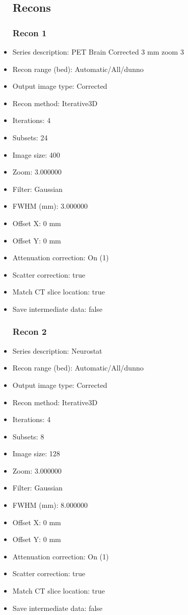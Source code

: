 \documentclass[12pt]{article}
\begin{document}
\begin{itemize}
\subsection{Recons}
\subsubsection{Recon 1}
\item Series description: PET Brain Corrected 3 mm zoom 3
\item Recon range (bed): Automatic/All/dunno
\item Output image type: Corrected
\item Recon method: Iterative3D
\item Iterations: 4
\item Subsets: 24
\item Image size: 400
\item Zoom: 3.000000
\item Filter: Gaussian
\item FWHM (mm): 3.000000
\item Offset X: 0 mm
\item Offset Y: 0 mm
\item Attenuation correction: On (1)
\item Scatter correction: true
\item Match CT slice location: true
\item Save intermediate data: false
\subsubsection{Recon 2}
\item Series description: Neurostat
\item Recon range (bed): Automatic/All/dunno
\item Output image type: Corrected
\item Recon method: Iterative3D
\item Iterations: 4
\item Subsets: 8
\item Image size: 128
\item Zoom: 3.000000
\item Filter: Gaussian
\item FWHM (mm): 8.000000
\item Offset X: 0 mm
\item Offset Y: 0 mm
\item Attenuation correction: On (1)
\item Scatter correction: true
\item Match CT slice location: true
\item Save intermediate data: false
\end{itemize}
\end{document}
